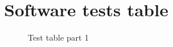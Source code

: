 \documentclass{article}
\begin{document}
\section{Software tests table}\label{sec:appendix-software-tests}

\begin{figure}[!htb]
	\caption{Test table part 1}
\end{figure}
\end{document}
